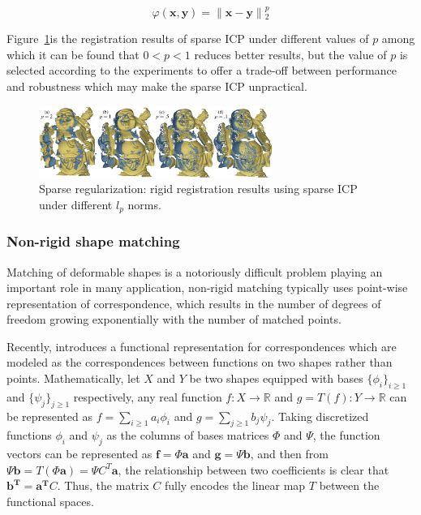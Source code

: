 \small{
\begin{equation}
 \label{eq:permutedsparse}
 \varphi(\mathbf{x},\mathbf{y})=\|\mathbf{x}-\mathbf{y}\|{_2^{p}}
\end{equation}
}

Figure~\ref{fig:sparseICP}is the registration results of sparse ICP under different values of $p$ among which it can be found that $0<p<1$ reduces better results,
but the value of $p$ is selected according to the experiments to offer a trade-off between performance and robustness which may make the sparse ICP unpractical.

\begin{figure}[ht]
  \centering
  \includegraphics[width=3in]{images/sparseICP}
  \caption{Sparse regularization: rigid registration results using sparse ICP\cite{chartrand2007exact} under different $l_{p}$ norms.}
  \label{fig:sparseICP}
\end{figure}

\subsubsection{Non-rigid shape matching}
\label{subsubsec:non-rigid shape matching}

Matching of deformable shapes is a notoriously difficult problem playing an important role in many application, non-rigid matching typically uses point-wise representation of correspondence, which results in the number of degrees of freedom growing exponentially with the number of matched points.

Recently, \cite{ovsjanikov2012functional} introduces a functional representation for correspondences which are modeled as the correspondences between functions on two shapes rather than points.
Mathematically, let $X$ and $Y$ be two shapes equipped with bases $\{\phi_{i}\}_{i\ge1}$ and $\{\psi_{j}\}_{j\ge1}$ respectively,
any real function $f: X\to \mathbb{R}$ and $g=T(f): Y\to \mathbb{R}$ can be represented as $f=\sum_{i\ge1}^{}a_{i}\phi_{i}$ and $g=\sum_{j\ge1}^{}b_{j}\psi_{j}$.
Taking discretized functions $\phi_{i}$ and $\psi_{j}$ as the columns of bases matrices $\Phi$ and $\Psi$,
the function vectors can be represented as
$\mathbf{f}=\Phi \mathbf{a}$ and
$\mathbf{g}=\Psi \mathbf{b}$, and then from
$\Psi \mathbf{b}=T(\Phi \mathbf{a})=\Psi C^{T}\mathbf{a}$,
the relationship between two coefficients is clear that $\mathbf{b^{T}}=\mathbf{a^{T}}C$.
Thus, the matrix $C$ fully encodes the linear map $T$ between the functional spaces.


